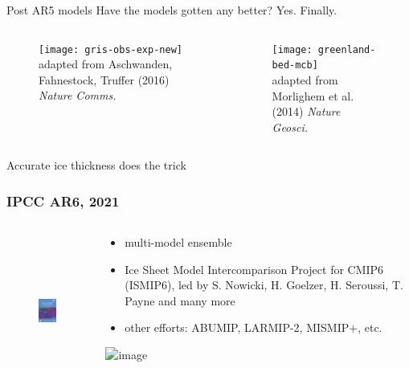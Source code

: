 \documentclass[hide notes,intlimits]{beamer}
\begin{document}
\begin{frame}{Post AR5 models}
  \alert{Have the models gotten any better? Yes. Finally.}
  \begin{columns}[c]
    \begin{column}{.6\linewidth}
    \begin{figure}
      \texttt{[image: gris-obs-exp-new]}
      \\ \tiny{adapted from Aschwanden, Fahnestock, Truffer (2016) \textit{Nature Comms.}}
    \end{figure}
    \end{column}
    \begin{column}{.4\linewidth}
      \begin{figure}
        \texttt{[image: greenland-bed-mcb]}
      \\ \tiny{adapted from Morlighem et al. (2014) \textit{Nature Geosci.}}
      \end{figure}
    \end{column}
  \end{columns}
  \alert{Accurate ice thickness does the trick}
  
\end{frame}


\begin{frame}
  \frametitle{IPCC AR6, 2021}
  \begin{columns}[c]
    \begin{column}{.4\linewidth}
      \begin{figure}
        \includegraphics[height=5cm]{ar6-wg1}
      \end{figure}
    \end{column}
    \begin{column}{.6\linewidth}
      \begin{itemize}
      \item multi-model ensemble
      \item Ice Sheet Model Intercomparison Project for CMIP6 (ISMIP6), led by S. Nowicki, H. Goelzer, H. Seroussi, T. Payne and many more
      \item other efforts: ABUMIP, LARMIP-2, MISMIP+, etc.
      \end{itemize}
        \includegraphics<1>[width=2.5cm]{ismip6_logo}
    \end{column}
  \end{columns}
\end{frame}
\end{document}
